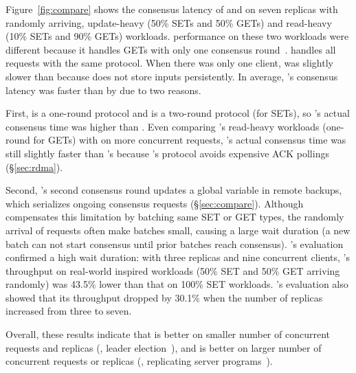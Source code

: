 Figure~\ref{fig:compare} shows the consensus latency of \xxx 
and \dare on seven replicas with randomly arriving, update-heavy (50\% SETs and 
50\% GETs) and read-heavy (10\% SETs and 90\% GETs) workloads. \dare 
performance on these two workloads were different because it handles GETs with 
only one consensus round~\cite{dare:hpdc15}. \xxx handles all requests with the 
same protocol. When there was only one client, \xxx was slightly slower than 
\dare because \dare does not store inputs persistently. In average, \xxx's 
consensus latency was faster than \dare by \fasterDARE due to two reasons.

First, \xxx is a one-round protocol and \dare is a two-round protocol (for 
SETs), so \dare's actual consensus time was \fasterDAREconsensusonly higher than 
\xxx. Even comparing \dare's read-heavy workloads (one-round for GETs) with 
\xxx on more concurrent requests, \xxx's actual consensus time was still 
slightly faster than \dare's because \xxx's protocol avoids expensive ACK 
pollings (\S\ref{sec:rdma}).

Second, \dare's second consensus round updates a global variable in remote 
backups, which serializes ongoing consensus requests (\S\ref{sec:compare}). 
Although \dare compensates this limitation by batching same SET or GET types, 
the randomly arrival of requests often make batches small, causing a large 
wait duration (a new batch can not start consensus until prior batches 
reach consensus). \dare's evaluation~\cite{dare:hpdc15} confirmed a high 
wait duration: with three replicas and nine concurrent clients, \dare's 
throughput on real-world inspired workloads (50\% SET and 50\% GET arriving 
randomly) was 43.5\% lower than that on 100\% SET workloads. \dare's 
evaluation also showed that its throughput dropped by 30.1\% when the number of 
replicas increased from three to seven.

Overall, these results indicate that \dare is better on smaller number of 
concurrent requests and replicas (\eg, 
leader election~\cite{chubby:osdi,zookeeper}), and \xxx is better on larger 
number of concurrent requests or replicas (\eg, replicating server 
programs~\cite{rex:eurosys14,crane:sosp15}).


